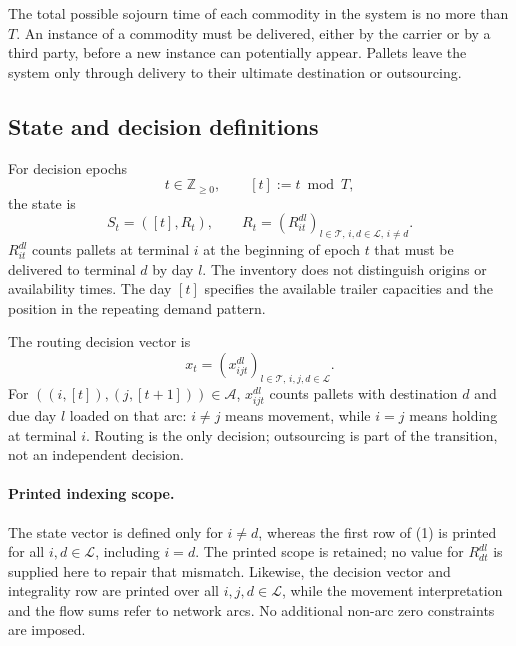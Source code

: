\documentclass{article}
\begin{document}
The total possible sojourn time of each commodity in the system is no more than $T$. An instance of a commodity must be delivered, either by the carrier or by a third party, before a new instance can potentially appear. Pallets leave the system only through delivery to their ultimate destination or outsourcing.

\subsection*{State and decision definitions}
For decision epochs
\[
t\in\mathbb{Z}_{\geq0},\qquad [t]:=t\bmod T,
\]
the state is
\[
S_t=([t],R_t),\qquad
R_t=(R_{it}^{dl})_{l\in\mathcal{T},\,i,d\in\mathcal{L},\,i\ne d}.
\]
$R_{it}^{dl}$ counts pallets at terminal $i$ at the beginning of epoch $t$ that must be delivered to terminal $d$ by day $l$. The inventory does not distinguish origins or availability times. The day $[t]$ specifies the available trailer capacities and the position in the repeating demand pattern.

The routing decision vector is
\[
x_t=(x_{ijt}^{dl})_{l\in\mathcal{T},\,i,j,d\in\mathcal{L}}.
\]
For $((i,[t]),(j,[t+1]))\in\mathcal{A}$, $x_{ijt}^{dl}$ counts pallets with destination $d$ and due day $l$ loaded on that arc: $i\ne j$ means movement, while $i=j$ means holding at terminal $i$. Routing is the only decision; outsourcing is part of the transition, not an independent decision.

\paragraph{Printed indexing scope.}
The state vector is defined only for $i\ne d$, whereas the first row of (1) is printed for all $i,d\in\mathcal{L}$, including $i=d$. The printed scope is retained; no value for $R_{dt}^{dl}$ is supplied here to repair that mismatch. Likewise, the decision vector and integrality row are printed over all $i,j,d\in\mathcal{L}$, while the movement interpretation and the flow sums refer to network arcs. No additional non-arc zero constraints are imposed.
\end{document}
